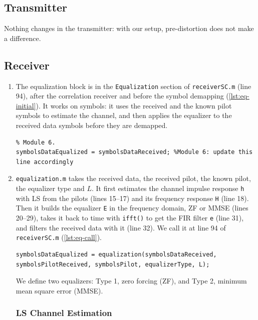\documentclass[11pt]{article}
\begin{document}
\subsection*{Transmitter}
Nothing changes in the transmitter: with our setup, pre-distortion does not make a difference.

\subsection*{Receiver}
\begin{enumerate}[resume]
    \item The equalization block is in the \texttt{Equalization} section of \texttt{receiverSC.m} (line 94), after the correlation receiver and before the symbol demapping (\cref{lst:eq-initial}). It works on symbols: it uses the received and the known pilot symbols to estimate the channel, and then applies the equalizer to the received data symbols before they are demapped.

\begin{lstlisting}[caption={Equalization block of the given \texttt{receiverSC.m} (lines 92--94).}, label={lst:eq-initial}]
%% Equalization
% Module 6.
symbolsDataEqualized = symbolsDataReceived; %Module 6: update this line accordingly
\end{lstlisting}

    \item \texttt{equalization.m} takes the received data, the received pilot, the known pilot, the equalizer type and $L$. It first estimates the channel impulse response \texttt{h} with LS from the pilots (lines 15--17) and its frequency response \texttt{H} (line 18). Then it builds the equalizer \texttt{E} in the frequency domain, ZF or MMSE (lines 20--29), takes it back to time with \texttt{ifft()} to get the FIR filter \texttt{e} (line 31), and filters the received data with it (line 32). We call it at line 94 of \texttt{receiverSC.m} (\cref{lst:eq-call}).

\begin{lstlisting}[caption={Our equalization call in \texttt{receiverSC.m} (line 94).}, label={lst:eq-call}]
symbolsDataEqualized = equalization(symbolsDataReceived, symbolsPilotReceived, symbolsPilot, equalizerType, L);
\end{lstlisting}

    We define two equalizers: Type 1, zero forcing (ZF), and Type 2, minimum mean square error (MMSE).

\subsubsection*{LS Channel Estimation}


\end{enumerate}
\end{document}
